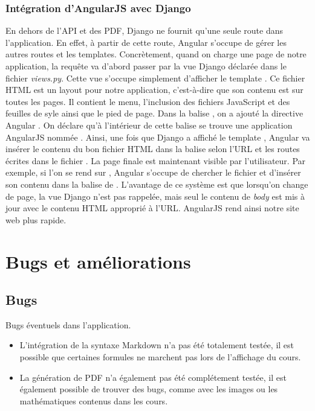 \documentclass[letterpaper,10pt,oneside]{sphinxmanual}
\begin{document}
\subsection{Intégration d'AngularJS avec Django}
\label{guide:integration-d-angularjs-avec-django}
En dehors de l'API et des PDF, Django ne fournit qu'une seule route dans l'application. En effet, à partir de cette route, Angular s'occupe de gérer les autres routes et les templates. Concrètement, quand on charge une page de notre application, la requête va d'abord passer par la vue Django  déclarée dans le fichier \emph{views.py}. Cette vue s'occupe simplement d'afficher le template . Ce fichier HTML est un layout pour notre application, c'est-à-dire que son contenu est sur toutes les pages. Il contient le menu, l'inclusion des fichiers JavaScript et des feuilles de syle ainsi que le pied de page. Dans la balise , on a ajouté la directive Angular . On déclare qu'à l'intérieur de cette balise se trouve une application AngularJS nommée . Ainsi, une fois que Django a affiché le template , Angular va insérer le contenu du bon fichier HTML dans la balise  selon l'URL et les routes écrites dans le fichier . La page finale est maintenant visible par l'utilisateur. Par exemple, si l'on se rend sur , Angular s'occupe de chercher le fichier  et d'insérer son contenu dans la balise  de . L'avantage de ce système est que lorsqu'on change de page, la vue Django n'est pas rappelée, mais seul le contenu de \emph{body} est mis à jour avec le contenu HTML approprié à l'URL. AngularJS rend ainsi notre site web plus rapide.


\chapter{Bugs et améliorations}
\label{bugs:bugs-et-ameliorations}\label{bugs::doc}

\section{Bugs}
\label{bugs:bugs}
Bugs éventuels dans l'application.
\begin{itemize}
\item {} 
L'intégration de la syntaxe Markdown n'a pas été totalement testée, il est possible que certaines formules ne marchent pas lors de l'affichage du cours.

\item {} 
La génération de PDF n'a également pas été complétement testée, il est également possible de trouver des bugs, comme avec les images ou  les mathématiques contenus dans les cours.

\end{itemize}
\end{document}
